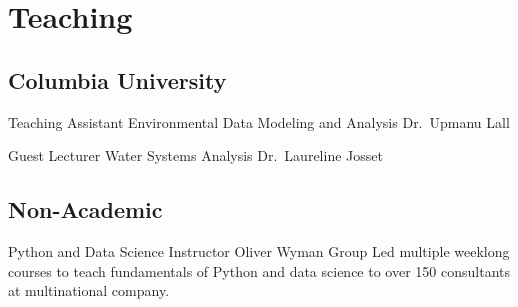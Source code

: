 \section{Teaching}

\subsection{Columbia University}

{Teaching Assistant}
{Environmental Data Modeling and Analysis}
{Dr.~Upmanu Lall}
{}
{}

{Guest Lecturer}
{Water Systems Analysis}
{Dr.~Laureline Josset}
{}
{}

\subsection{Non-Academic}

{Python and Data Science Instructor}
{Oliver Wyman Group}
{}
{}
{Led multiple weeklong courses to teach fundamentals of Python and data science to over 150 consultants at multinational company.}